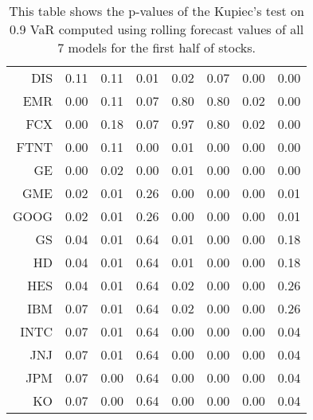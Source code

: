 \begin{table}[ht]
\begin{tabular}{rrrrrrrr}
  DIS & 0.11 & 0.11 & 0.01 & 0.02 & 0.07 & 0.00 & 0.00 \\ 
  EMR & 0.00 & 0.11 & 0.07 & 0.80 & 0.80 & 0.02 & 0.00 \\ 
  FCX & 0.00 & 0.18 & 0.07 & 0.97 & 0.80 & 0.02 & 0.00 \\ 
  FTNT & 0.00 & 0.11 & 0.00 & 0.01 & 0.00 & 0.00 & 0.00 \\ 
  GE & 0.00 & 0.02 & 0.00 & 0.01 & 0.00 & 0.00 & 0.00 \\ 
  GME & 0.02 & 0.01 & 0.26 & 0.00 & 0.00 & 0.00 & 0.01 \\ 
  GOOG & 0.02 & 0.01 & 0.26 & 0.00 & 0.00 & 0.00 & 0.01 \\ 
  GS & 0.04 & 0.01 & 0.64 & 0.01 & 0.00 & 0.00 & 0.18 \\ 
  HD & 0.04 & 0.01 & 0.64 & 0.01 & 0.00 & 0.00 & 0.18 \\ 
  HES & 0.04 & 0.01 & 0.64 & 0.02 & 0.00 & 0.00 & 0.26 \\ 
  IBM & 0.07 & 0.01 & 0.64 & 0.02 & 0.00 & 0.00 & 0.26 \\ 
  INTC & 0.07 & 0.01 & 0.64 & 0.00 & 0.00 & 0.00 & 0.04 \\ 
  JNJ & 0.07 & 0.01 & 0.64 & 0.00 & 0.00 & 0.00 & 0.04 \\ 
  JPM & 0.07 & 0.00 & 0.64 & 0.00 & 0.00 & 0.00 & 0.04 \\ 
  KO & 0.07 & 0.00 & 0.64 & 0.00 & 0.00 & 0.00 & 0.04 \\ 
   \hline
\end{tabular}
\caption[Kupiec's test p-values, alpha =0.9 (1)]{This table shows the p-values of the Kupiec's test on 0.9 VaR computed using rolling forecast values of all 7 models for the first half of stocks.} 
\label{Table:Kupiec_test_rolling_0.9_1}
\end{table}
